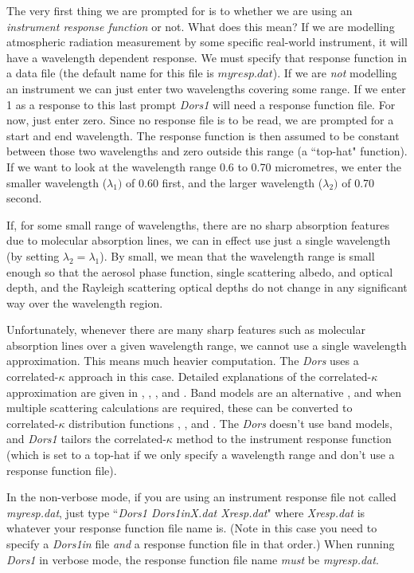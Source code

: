 \documentclass[12pt]{article}
\begin{document}
The very first thing we are prompted for is to whether we are using an {\it instrument response function} or not.
What does this mean?  If we are modelling atmospheric radiation measurement by some specific real-world 
instrument,  it will have  a wavelength dependent response. We must specify that response function in a data file
 (the default name for this file is $myresp.dat$). If we are {\it not} modelling an instrument
 we can just enter two wavelengths covering some range. If we enter 1 as a response to this last prompt {\it Dors1} will
need a response function file. For now, just enter zero. Since no response file is to be read, 
we are prompted for a start and end wavelength. The response function is then assumed to be constant between those two 
wavelengths and zero outside this range (a ``top-hat" function). If we want to look at the wavelength
range 0.6 to 0.70 micrometres, we enter the smaller wavelength ($\lambda_1)$ of 0.60 first, and the larger
wavelength ($\lambda_2)$ of 0.70 second. 

If, for some small range of wavelengths, there are no sharp absorption  features due
 to molecular absorption lines, we can in effect use just a single wavelength (by setting $\lambda_2=\lambda_1$).
By small, we mean that the wavelength range is
small enough so that the aerosol phase function, single scattering albedo, and optical depth,
 and the Rayleigh scattering optical depths do
 not change in any significant way over the wavelength region. 

Unfortunately, whenever there are many sharp features such as molecular absorption lines over a given wavelength
range, we cannot use a single wavelength approximation.
This means much heavier computation.
The {\it Dors} uses a correlated-$\kappa$ approach in this case. 
Detailed explanations of the correlated-$\kappa$ approximation are given in \cite{GoodyWest:Mybib}, 
\cite{LacisOinas:Mybib}, \cite{FuLiou:Mybib}, and \cite{RoseKratz:Mybib}. 
Band models are an alternative \cite{GoodyYung:Mybib} \cite{Liou:Mybib},
and when multiple scattering calculations are required, these can be converted
to correlated-$\kappa$ distribution functions \cite{Goody:Mybib}, \cite{Domoto:Mybib}, and
 \cite{GodsalveBand:Mybib}. The {\it Dors} doesn't use band models, and {\it Dors1} tailors the correlated-$\kappa$ method 
 to the  instrument response function (which is set to a top-hat if we only specify a wavelength range and don't use a response function file). 

In the non-verbose mode, if you are using an instrument response file not called {\it myresp.dat}, just 
type ``{\it Dors1 Dors1inX.dat Xresp.dat}" where {\it Xresp.dat} is whatever
your response function file name is. (Note in this case you need to specify a {\it Dors1in} file {\it and} a response function
file in that order.) When running {\it Dors1} in verbose
mode, the response function file name {\it must} be {\it myresp.dat}. 
\end{document}
